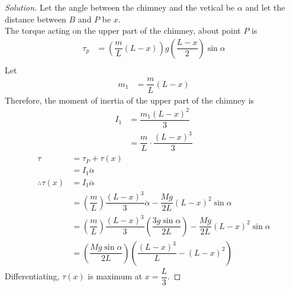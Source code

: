\documentclass[fleqn, a4paper, 12pt]{article}
\theoremstyle{definition}
\theoremstyle{theorem}
\newenvironment{solution}
{\begin{proof}[Solution]\let\qed\relax}
	{\end{proof}}
\begin{document}
\begin{solution}
	Let the angle between the chimney and the vetical be $\alpha$ and let the distance between $B$ and $P$ be $x$.\\
	The torque acting on the upper part of the chimney, about point $P$ is
	\begin{align*}
		\tau_p &= \left( \dfrac{m}{L} (L - x) \right) g \left( \dfrac{L - x}{2} \right) \sin \alpha\\
	\end{align*}
	Let
	\begin{align*}
		m_1 &= \dfrac{m}{L} (L - x)
	\end{align*}
	Therefore, the moment of inertia of the upper part of the chimney is
	\begin{align*}
		I_1 &= \dfrac{m_1(L - x)^2}{3}\\
		&= \dfrac{m}{L} \cdot \dfrac{(L - x)^3}{3}
	\end{align*}
	\begin{align*}
		\tau &= \tau_P + \tau(x)\\
		&= I_1 \ddot{\alpha}\\
		\therefore \tau(x) &= I_1 \ddot{\alpha}\\
		&= \left( \dfrac{m}{L} \right) \dfrac{(L - x)^3}{3} \ddot{\alpha} - \dfrac{M g}{2 L} (L - x)^2 \sin \alpha\\
		&= \left( \dfrac{m}{L} \right) \dfrac{(L - x)^3}{3} \left( \dfrac{3 g \sin \alpha}{2 L} \right) - \dfrac{M g}{2 L} (L - x)^2 \sin \alpha\\
		&= \left( \dfrac{M g \sin \alpha}{2 L} \right) \left( \dfrac{(L - x)^3}{L} - (L - x)^2 \right)
	\end{align*}
	Differentiating, $\tau(x)$ is maximum at $x = \dfrac{L}{3}$.
\end{solution}
\end{document}
